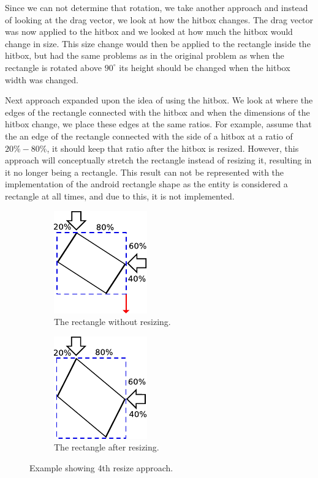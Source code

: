 Since we can not determine that rotation, we take another approach and instead of looking at the drag vector, we look at how the hitbox changes. 
The drag vector was now applied to the hitbox and we looked at how much the hitbox would change in size.
This size change would then be applied to the rectangle inside the hitbox, but had the same problems as in the original problem as when the rectangle is rotated above $90^\circ$ its height should be changed when the hitbox width was changed.

Next approach expanded upon the idea of using the hitbox. 
We look at where the edges of the rectangle connected with the hitbox and when the dimensions of the hitbox change, we place these edges at the same ratios.
For example, assume that the an edge of the rectangle connected with the side of a hitbox at a ratio of $20\% - 80\%$, it should keep that ratio after the hitbox is resized.
However, this approach will conceptually stretch the rectangle instead of resizing it, resulting in it no longer being a rectangle.
This result can not be represented with the implementation of the android rectangle shape as the entity is considered a rectangle at all times, and due to this, it is not implemented.
\begin{figure}[h]
	\centering
	\begin{subfigure}[b]{0.45\textwidth}
		\centering
		\includegraphics[scale=1]{media/sprint3/scaling-no-stretching}
		\caption{The rectangle without resizing.}
		\label{figure:app4.1}
	\end{subfigure}
	\qquad
	\begin{subfigure}[b]{0.45\textwidth}
		\centering
			\includegraphics[scale=1]{media/sprint3/scaling-with-stretching}
			\caption{The rectangle after resizing.}
		\label{figure:app4.2}
	\end{subfigure}
	\caption{Example showing 4th resize approach.}
	\label{figure:app4}
\end{figure}
